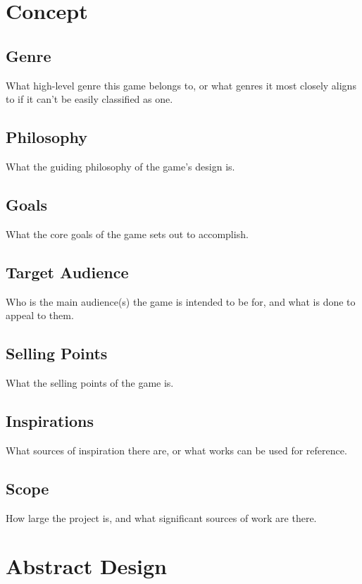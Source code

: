 

\usepackage{minted}
\newcommand*{\img}[1]{%
    \raisebox{-.17\baselineskip}{%
        \texttt{[image: \#1]}%
    }%
}



\section{Concept}
\subsection{Genre}
What high-level genre this game belongs to, or what genres it most closely aligns to if it can't be easily classified as one.
\subsection{Philosophy}
What the guiding philosophy of the game's design is.
\subsection{Goals}
What the core goals of the game sets out to accomplish.
\subsection{Target Audience}
Who is the main audience(s) the game is intended to be for, and what is done to appeal to them.
\subsection{Selling Points}
What the selling points of the game is.
\subsection{Inspirations}
What sources of inspiration there are, or what works can be used for reference.
\subsection{Scope}
How large the project is, and what significant sources of work are there.

\section{Abstract Design}
